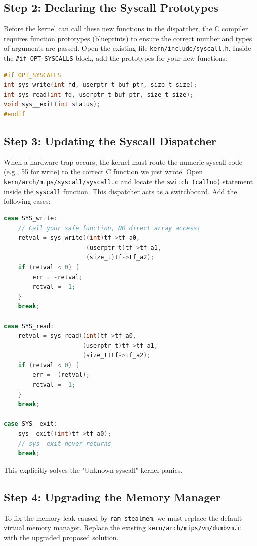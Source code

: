 \subsection{Step 2: Declaring the Syscall Prototypes}
Before the kernel can call these new functions in the dispatcher, the C compiler requires function prototypes (blueprints) to ensure the correct number and types of arguments are passed. Open the existing file \texttt{kern/include/syscall.h}. Inside the \texttt{\#if OPT\_SYSCALLS} block, add the prototypes for your new functions: 
\begin{lstlisting}[language=C]
#if OPT_SYSCALLS
int sys_write(int fd, userptr_t buf_ptr, size_t size);
int sys_read(int fd, userptr_t buf_ptr, size_t size);
void sys__exit(int status);
#endif
\end{lstlisting}

\subsection{Step 3: Updating the Syscall Dispatcher}
When a hardware trap occurs, the kernel must route the numeric syscall code (e.g., 55 for write) to the correct C function we just wrote. Open \texttt{kern/arch/mips/syscall/syscall.c} and locate the \texttt{switch (callno)} statement inside the \texttt{syscall} function. This dispatcher acts as a switchboard. Add the following cases:

\begin{lstlisting}[language=C]
case SYS_write:
    // Call your safe function, NO direct array access!
    retval = sys_write((int)tf->tf_a0, 
                       (userptr_t)tf->tf_a1, 
                       (size_t)tf->tf_a2);
    if (retval < 0) {
        err = -retval; 
        retval = -1;
    }
    break;

case SYS_read:
    retval = sys_read((int)tf->tf_a0, 
                      (userptr_t)tf->tf_a1, 
                      (size_t)tf->tf_a2);
    if (retval < 0) {
        err = -(retval);
        retval = -1;
    }
    break;

case SYS__exit:
    sys__exit((int)tf->tf_a0);
    // sys__exit never returns
    break;
\end{lstlisting}
This explicitly solves the "Unknown syscall" kernel panics.

\subsection{Step 4: Upgrading the Memory Manager}
To fix the memory leak caused by \texttt{ram\_stealmem}, we must replace the default virtual memory manager. Replace the existing \texttt{kern/arch/mips/vm/dumbvm.c} with the upgraded proposed solution. 

